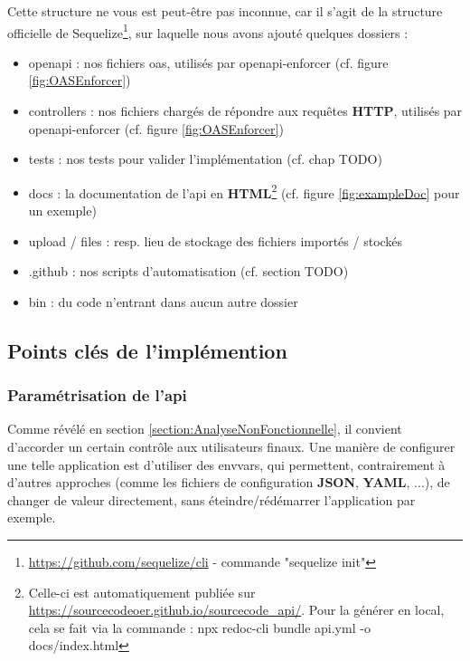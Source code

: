 Cette structure ne vous est peut-être pas inconnue, car il s'agit de la structure officielle de Sequelize\footnote{
    \url{https://github.com/sequelize/cli} - commande "sequelize init"
}, sur laquelle nous avons ajouté quelques dossiers :

\begin{itemize}
    \item openapi : nos fichiers \Gls{oas}, utilisés par openapi-enforcer (cf. figure \ref{fig:OASEnforcer})
    \item controllers : nos fichiers chargés de répondre aux requêtes \textbf{HTTP}, utilisés par openapi-enforcer (cf. figure \ref{fig:OASEnforcer})
    \item tests : nos tests pour valider l'implémentation (cf. chap TODO)
    \item docs : la documentation de l'\Gls{api} en \textbf{HTML}\footnote{
        Celle-ci est automatiquement publiée sur 
        \href{https://sourcecodeoer.github.io/sourcecode\_api/}{https://sourcecodeoer.github.io/sourcecode\_api/}.
        Pour la générer en local, cela se fait via la commande : 
        npx redoc-cli bundle api.yml -o docs/index.html 
    } (cf. figure \ref{fig:exampleDoc} pour un exemple)
    \item upload / files : resp. lieu de stockage des fichiers importés / stockés 
    \item .github : nos scripts d'automatisation (cf. section TODO) 
    \item bin : du code n'entrant dans aucun autre dossier
\end{itemize}

\pagebreak
\subsection{Points clés de l'implémention}

\subsubsection{Paramétrisation de l'\Gls{api}}

Comme révélé en section \ref{section:AnalyseNonFonctionnelle}, il convient d'accorder un certain contrôle aux utilisateurs finaux.
Une manière de configurer une telle application est d'utiliser des \glspl{envvar}, 
qui permettent, contrairement à d'autres approches (comme les fichiers de configuration \textbf{JSON}, \textbf{YAML}, ...), 
de changer de valeur directement, sans éteindre/rédémarrer l'application par exemple. \\

